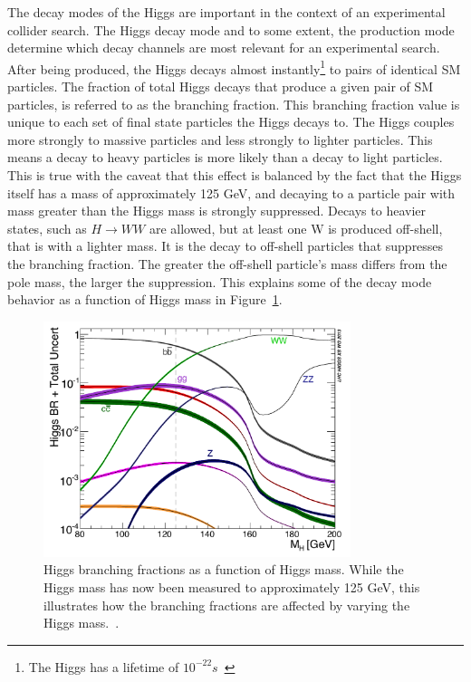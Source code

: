 The decay modes of the Higgs are important in the context of an experimental collider search. The Higgs decay mode and to some extent, the production mode
determine which decay channels are most relevant for an experimental search. After being produced, the Higgs decays almost instantly\footnote{
The Higgs has a lifetime of $10^{-22}s$~\cite{pdg}} to pairs of identical SM particles. 
The fraction of total Higgs decays that produce a given pair of SM particles, is referred to as the branching fraction. This branching fraction value is unique
to each set of final state particles the Higgs decays to.
The Higgs couples more strongly to massive particles and less strongly to lighter particles. This means a decay to heavy
particles is more likely than a decay to light particles. This is true with the caveat that this effect is balanced by the fact that the Higgs itself has a
mass of approximately 125 GeV, and decaying to a particle pair with mass greater than the Higgs mass is strongly suppressed. Decays to heavier
states, such as $H\rightarrow WW$ are allowed, but at least one W is produced off-shell, that is with a lighter mass. It is the decay to off-shell
particles that suppresses the branching fraction. The greater the off-shell particle's mass differs from the pole mass, the larger the suppression.
This explains some of the decay mode behavior as a function of Higgs mass in
Figure~\ref{fig:higgs_decay}.

\begin{figure}[hbtp]
 \begin{center}
   \includegraphics[width=0.8\textwidth]{ch2_figs/higgs_decay.pdf}
   \caption[Higgs branching fractions vs mass]{Higgs branching fractions as a function of Higgs mass. While the Higgs mass has now been measured
     to approximately 125 GeV, this illustrates how the branching fractions are affected by varying the Higgs mass.~\cite{lhchxswg}.}
   \label{fig:higgs_decay}
 \end{center}
\end{figure}

